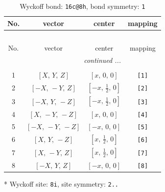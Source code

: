 \documentclass[fleqn,8pt]{jsarticle}
\begin{document}
\renewcommand{\arraystretch}{1.2}
\begin{longtable}{cccc}
\caption{Wyckoff bond: {\tt 16c@8h}, bond symmetry: {\tt 1}}
 \\
 \hline \hline
No. & vector & center & mapping \\ \hline \endfirsthead

\multicolumn{3}{l}{\tablename\ \thetable{}} \\
 \hline \hline
No. & vector & center & mapping \\ \hline \endhead

 \hline \hline
\multicolumn{3}{r}{\footnotesize\it continued ...} \\ \endfoot

 \hline \hline
\multicolumn{3}{r}{} \\ \endlastfoot

1 & $\left[ X,\, Y,\, Z \right]$ & $\left[ x,\, 0,\, 0 \right]$ & {\tt [1]} \\ \hline
2 & $\left[ - X,\, - Y,\, Z \right]$ & $\left[ - x,\, \frac{1}{2},\, 0 \right]$ & {\tt [2]} \\ \hline
3 & $\left[ - X,\, Y,\, - Z \right]$ & $\left[ - x,\, \frac{1}{2},\, 0 \right]$ & {\tt [3]} \\ \hline
4 & $\left[ X,\, - Y,\, - Z \right]$ & $\left[ x,\, 0,\, 0 \right]$ & {\tt [4]} \\ \hline
5 & $\left[ - X,\, - Y,\, - Z \right]$ & $\left[ - x,\, 0,\, 0 \right]$ & {\tt [5]} \\ \hline
6 & $\left[ X,\, Y,\, - Z \right]$ & $\left[ x,\, \frac{1}{2},\, 0 \right]$ & {\tt [6]} \\ \hline
7 & $\left[ X,\, - Y,\, Z \right]$ & $\left[ x,\, \frac{1}{2},\, 0 \right]$ & {\tt [7]} \\ \hline
8 & $\left[ - X,\, Y,\, Z \right]$ & $\left[ - x,\, 0,\, 0 \right]$ & {\tt [8]} \\
\end{longtable}
* Wyckoff site: {\tt 8i}, site symmetry: {\tt 2..}
\renewcommand{\arraystretch}{1.2}
\end{document}
